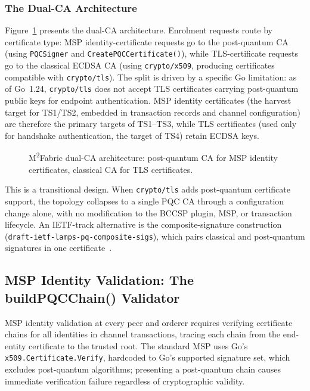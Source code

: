 \documentclass{ieeetj}
\begin{document}
\subsubsection{The Dual-CA Architecture}

Figure~\ref{fig:dual_ca_architecture} presents the dual-CA architecture.
Enrolment requests route by certificate type: MSP identity-certificate requests
go to the post-quantum CA (using \texttt{PQCSigner} and
\texttt{CreatePQCCertificate()}), while TLS-certificate requests go to the
classical ECDSA CA (using \texttt{crypto/x509}, producing certificates
compatible with \texttt{crypto/tls}). The split is driven by a specific Go
limitation: as of Go~1.24, \texttt{crypto/tls} does not accept TLS certificates
carrying post-quantum public keys for endpoint authentication. MSP identity
certificates (the harvest target for TS1/TS2, embedded in transaction records
and channel configuration) are therefore the primary targets of TS1--TS3, while
TLS certificates (used only for handshake authentication, the target of TS4)
retain ECDSA keys.

\begin{figure}[ht]
\centering

\caption[M\textsuperscript{2}Fabric dual-CA architecture.]
{M\textsuperscript{2}Fabric dual-CA architecture: post-quantum CA for MSP identity certificates, classical CA for TLS certificates.}
\label{fig:dual_ca_architecture}
\end{figure}

This is a transitional design. When \texttt{crypto/tls} adds post-quantum
certificate support, the topology collapses to a single PQC CA through a
configuration change alone, with no modification to the BCCSP plugin, MSP, or
transaction lifecycle. An IETF-track alternative is the composite-signature
construction (\texttt{draft-ietf-lamps-pq-composite-sigs}), which pairs
classical and post-quantum signatures in one
certificate~\cite{ounsworth2024composite}.

\subsection{MSP Identity Validation: The buildPQCChain() Validator}
\label{sec:method_msp}

MSP identity validation at every peer and orderer requires verifying certificate
chains for all identities in channel transactions, tracing each chain from the
end-entity certificate to the trusted root. The standard MSP uses Go's
\texttt{x509.Certificate.Verify}, hardcoded to Go's supported signature set,
which excludes post-quantum algorithms; presenting a post-quantum chain causes
immediate verification failure regardless of cryptographic validity.
\end{document}
